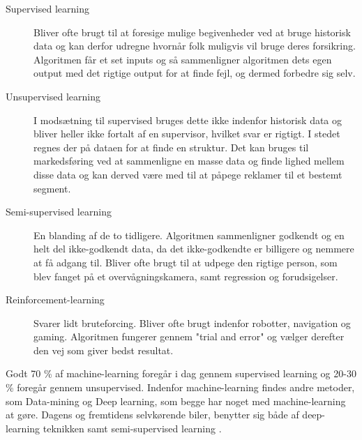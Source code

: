 	\begin{description}
		\item[Supervised learning] Bliver ofte brugt til at foresige mulige begivenheder ved at bruge historisk data og kan derfor udregne hvornår folk muligvis vil bruge deres forsikring. Algoritmen får et set inputs og så sammenligner algoritmen dets egen output med det rigtige output for at finde fejl, og dermed forbedre sig selv.
		\item[Unsupervised learning] I modsætning til supervised bruges dette ikke indenfor historisk data og bliver heller ikke fortalt af en supervisor, hvilket svar er rigtigt. I stedet regnes der på dataen for at finde en struktur. Det kan bruges til markedsføring ved at sammenligne en masse data og finde lighed mellem disse data og kan derved være med til at påpege reklamer til et bestemt segment.
		\item[Semi-supervised learning] En blanding af de to tidligere. Algoritmen sammenligner godkendt og en helt del ikke-godkendt data, da det ikke-godkendte er billigere og nemmere at få adgang til. Bliver ofte brugt til at udpege den rigtige person, som blev fanget på et overvågningskamera, samt regression og forudsigelser.
		\item[Reinforcement-learning] Svarer lidt bruteforcing. Bliver ofte brugt indenfor robotter, navigation og gaming. Algoritmen fungerer gennem "trial and error" og vælger derefter den vej som giver bedst resultat.
	\end{description}
Godt 70 \% af machine-learning foregår i dag gennem supervised learning og 20-30 \% foregår gennem unsupervised. Indenfor machine-learning findes andre metoder, som Data-mining og Deep learning, som begge har noget med machine-learning at gøre. Dagens og fremtidens selvkørende biler, benytter sig både af deep-learning teknikken samt semi-supervised learning \cite{Musk}. 

